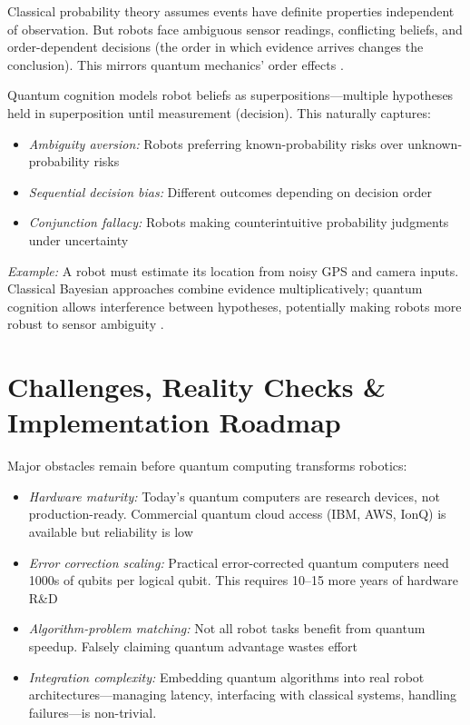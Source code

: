 \documentclass[conference]{IEEEtran}
\begin{document}
Classical probability theory assumes events have definite properties independent of observation. But robots face ambiguous sensor readings, conflicting beliefs, and order-dependent decisions (the order in which evidence arrives changes the conclusion). This mirrors quantum mechanics' order effects \cite{b49, b50, b51}.

Quantum cognition models robot beliefs as superpositions---multiple hypotheses held in superposition until measurement (decision). This naturally captures:

\begin{itemize}
\item \textit{Ambiguity aversion:} Robots preferring known-probability risks over unknown-probability risks \cite{b52, b53}
\item \textit{Sequential decision bias:} Different outcomes depending on decision order \cite{b51, b54}
\item \textit{Conjunction fallacy:} Robots making counterintuitive probability judgments under uncertainty \cite{b55, b56}
\end{itemize}

\textit{Example:} A robot must estimate its location from noisy GPS and camera inputs. Classical Bayesian approaches combine evidence multiplicatively; quantum cognition allows interference between hypotheses, potentially making robots more robust to sensor ambiguity \cite{b1, b57, b58}.

\section{Challenges, Reality Checks \& Implementation Roadmap}

Major obstacles remain before quantum computing transforms robotics:

\begin{itemize}
\item \textit{Hardware maturity:} Today's quantum computers are research devices, not production-ready. Commercial quantum cloud access (IBM, AWS, IonQ) is available but reliability is low \cite{b9, b10, b11}

\item \textit{Error correction scaling:} Practical error-corrected quantum computers need 1000s of qubits per logical qubit. This requires 10--15 more years of hardware R\&D \cite{b13, b14}

\item \textit{Algorithm-problem matching:} Not all robot tasks benefit from quantum speedup. Falsely claiming quantum advantage wastes effort \cite{b59, b60, b61}

\item \textit{Integration complexity:} Embedding quantum algorithms into real robot architectures---managing latency, interfacing with classical systems, handling failures---is non-trivial.
\end{itemize}
\end{document}
